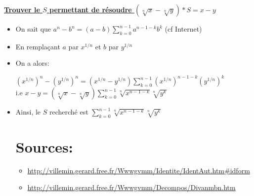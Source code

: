 \documentclass[a4paper,11pt]{report}
\begin{document}
\renewcommand{\labelitemi}{$\cdot$}
\begin{Large}\begin{center} 
   \underline{\textbf{Trouver le $S$ permettant de résoudre $(\sqrt[n\,]{x}-\sqrt[n\,]{y})*S = x-y$}} 
\end{center}\end{Large}
\begin{itemize}
	\item On sait que $a^n-b^n = (a-b) \sum\limits_{k=0}^{n-1}{a^{n-1-k}b^k}$ (cf Internet)\\
	
	\item En remplaçant $a$ par $x^{1/n}$ et $b$ par $y^{1/n}$\\
	
	\item On a alors:\\
	\begin{center}
	${(x^{1/n})}^n-{(y^{1/n})}^n = (x^{1/n}-y^{1/n})\sum\limits_{k=0}^{n-1}{(x^{1/n})^{n-1-k}(y^{1/n})^k}$\\
	i.e $x-y = (\sqrt[n\,]{x}-\sqrt[n\,]{y})\sum\limits_{k=0}^{n-1}{\sqrt[n\,]{x^{n-1-k}}\sqrt[n\,]{y^k}}$\\
	\end{center}
	
	\item Ainsi, le $S$ recherché est $\sum\limits_{k=0}^{n-1}{\sqrt[n\,]{x^{n-1-k}}\sqrt[n\,]{y^k}}$
	
\section{Sources:}
\begin{itemize}
	\item \url{http://villemin.gerard.free.fr/Wwwgvmm/Identite/IdentAut.htm#idform}
	\item \url{http://villemin.gerard.free.fr/Wwwgvmm/Decompos/Divanmbn.htm}
\end{itemize}
\end{itemize}
\end{document}
